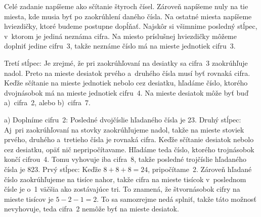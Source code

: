 {%
Celé zadanie napíšeme ako sčítanie štyroch čísel. Zároveň napíšeme nuly na tie
miesta, kde musia byť po zaokrúhlení daného čísla. Na ostatné miesta napíšeme
hviezdičky, ktoré budeme postupne dopĺňať.
Najskôr si všimnime posledný stĺpec, v~ktorom je jediná neznáma cifra.
Na miesto príslušnej hviezdičky môžeme doplniť jedine cifru~3, takže neznáme číslo má na mieste jednotiek cifru~3.

Tretí stĺpec:
Je zrejmé, že pri zaokrúhľovaní na desiatky sa cifra~$3$ zaokrúhľuje nadol. Preto na mieste desiatok
prvého a~druhého čísla musí byť rovnaká cifra. Keďže sčítanie na mieste jednotiek nebolo cez desiatku,
hľadáme číslo, ktorého dvojnásobok má na mieste jednotiek cifru~4. Na mieste desiatok môže byť
buď a)~cifra~2, alebo b)~cifra~7.

\smallskip
a) Doplníme cifru~2: Posledné dvojčíslie hľadaného čísla je 23.
Druhý stĺpec:
Aj~pri zaokrúhľovaní na stovky zaokrúhľujeme nadol, takže na mieste stoviek
prvého, druhého a~tretieho čísla je rovnaká cifra. Keďže sčítanie desiatok
nebolo cez desiatku, opäť nič nepripočítavame. Hľadáme teda číslo, ktorého
trojnásobok končí cifrou~4. Tomu vyhovuje iba cifra~8, takže posledné
trojčíslie hľadaného čísla je 823.
Prvý stĺpec:
Keďže $8 + 8 + 8 = 24$, pripočítame~2. Zároveň
hľadané číslo zaokrúhľujeme na tisíce nahor, takže cifra na mieste tisícok
v~poslednom čísle je o~1 väčšia ako zostávajúce tri. To znamená, že štvornásobok
cifry na mieste tisícov je $5 - 2 - 1 = 2$. To sa samozrejme nedá splniť, takže
táto možnosť nevyhovuje, teda cifra~2 nemôže byť na mieste desiatok.

}
